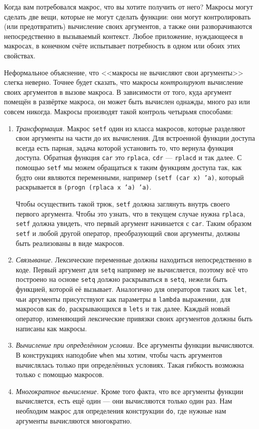 \documentclass[12pt, a4paper]{article} %
\begin{document}
Когда вам потребовался макрос, что вы хотите получить от него? Макросы могут сделать две вещи, которые не могут сделать функции: они могут контролировать (или предотвратить) вычисление своих аргументов, а также они разворачиваются непосредственно в вызываемый контекст. Любое приложение, нуждающееся в макросах, в конечном счёте испытывает потребность в одном или обоих этих свойствах.

Неформальное объяснение, что <<макросы не вычисляют свои аргументы>> слегка неверно. Точнее будет сказать, что макросы \textit{контролируют} вычисление своих аргументов в вызове макроса. В зависимости от того, куда аргумент помещён в развёртке макроса, он может быть вычислен однажды, много раз или совсем никогда. Макросы производят такой контроль четырьмя способами:
\begin{enumerate}
    \item \textit{Трансформация.} Макрос \texttt{setf} один из класса макросов, которые разделяют свои аргументы на части до их вычисления. Для встроенной функции доступа всегда есть парная, задача которой  установить то, что вернула функция доступа. Обратная функция \texttt{car} это \texttt{rplaca}, \texttt{cdr} --- \texttt{rplacd} и так далее. С помощью \texttt{setf} мы можем обращаться к таким функциям доступа так, как будто они являются переменными, например \texttt{(setf (car x) 'a)}, который раскрывается в \texttt{(progn (rplaca x 'a) 'a)}.

    Чтобы осуществить такой трюк, \texttt{setf} должна заглянуть внутрь своего первого аргумента. Чтобы это узнать, что в текущем случае нужна \texttt{rplaca}, \texttt{setf} должна увидеть, что первый аргумент начинается с \texttt{car}. Таким образом \texttt{setf} и любой другой оператор, преобразующий свои аргументы, должны быть реализованы в виде макросов.

    \item \textit{Связывание.} Лексические переменные должны находиться непосредственно в коде. Первый аргумент для \texttt{setq} например не вычисляется, поэтому всё что построено на основе \texttt{setq} должно раскрываться в \texttt{setq}, нежели быть функцией, которой её вызывает. Аналогично для операторов таких как \texttt{let}, чьи аргументы присутствуют как параметры в \texttt{lambda} выражении, для макросов как \texttt{do}, раскрывающихся в \texttt{lets} и так далее. Каждый новый оператор, изменяющий лексические привязки своих аргументов должны быть написаны как макросы.
    \item \textit{Вычисление при определённом условии.} Все аргументы функции вычисляются. В конструкциях наподобие \texttt{when} мы хотим, чтобы часть аргументов вычислялась только при определённых условиях. Такая гибкость возможна только с помощью макросов.
    \item \textit{Многократное вычисление.} Кроме того факта, что все аргументы функции вычисляется, есть ещё один --- они вычисляются только один раз. Нам необходим макрос для определения конструкции \texttt{do}, где нужные нам аргументы вычисляются многократно.
\end{enumerate}
\end{document}
